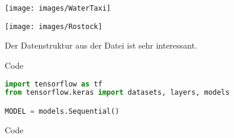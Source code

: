 {
  \begin{center}
    \texttt{[image: images/WaterTaxi]}
  \end{center}	
}

{
	\begin{center}
		\texttt{[image: images/Rostock]}
	\end{center}	
}


{
  Der Datenstruktur  aus der Datei  ist sehr interessant.	
}


\begin{frame}[fragile]{Code}


  \begin{lstlisting}[language=Python]
import tensorflow as tf
from tensorflow.keras import datasets, layers, models

MODEL = models.Sequential()
  \end{lstlisting}

\end{frame}

\begin{frame}[fragile]{Code}

  
\end{frame}
